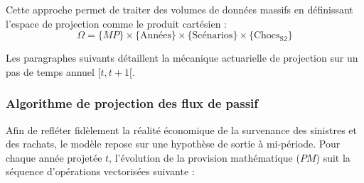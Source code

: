 Cette approche permet de traiter des volumes de données massifs en définissant l'espace de projection comme le produit cartésien :
\[ \Omega = \{MP\} \times \{\text{Années}\} \times \{\text{Scénarios}\} \times \{\text{Chocs}_{\text{S2}}\} \]

Les paragraphes suivants détaillent la mécanique actuarielle de projection sur un pas de temps annuel $[t, t+1[$.

\subsubsection*{Algorithme de projection des flux de passif}

Afin de refléter fidèlement la réalité économique de la survenance des sinistres et des rachats, le modèle repose sur une hypothèse de sortie à mi-période. Pour chaque année projetée $t$, l'évolution de la provision mathématique ($PM$) suit la séquence d'opérations vectorisées suivante :

